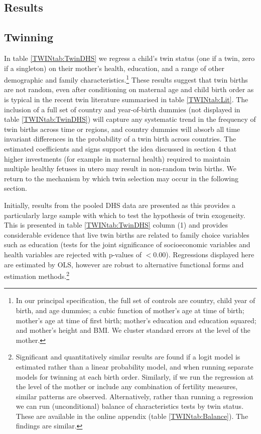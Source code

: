 \documentclass[subeqn]{article}
\begin{document}
\begin{spacing}{1.4}
\section{Results}                                  \label{TWINscn:results}
\subsection{Twinning}                              \label{TWINsscn:twinning}
In table \ref{TWINtab:TwinDHS} we regress a child's twin status (one if a twin, 
zero if a singleton) on their mother's health, education, and a range of other 
demographic and family characteristics.\footnote{In our principal specification, 
the full set of controls are country, child year of birth, and age dummies; a 
cubic function of mother's age at time of birth; mother's age at time of first 
birth; mother's education and education squared; and mother's height and BMI. 
We cluster standard errors at the level of the mother.}  These results suggest
that twin births are not random, even after conditioning on maternal age and 
child birth order as is typical in the recent twin literature summarised in table
\ref{TWINtab:Lit}. The inclusion of a full set of country and year-of-birth
dummies (not displayed in table \ref{TWINtab:TwinDHS}) will capture any 
systematic trend in the frequency of twin births across time or regions, and 
country dummies will absorb all time invariant differences in the probability 
of a twin birth across countries. The estimated coefficients and signs support 
the idea discussed in section 4 that higher investments (for example in maternal 
health) required to maintain multiple healthy fetuses in utero may result in 
non-random twin births. We return to the mechanism by which twin selection may
occur in the following section.

Initially, results from the pooled DHS data are presented as this provides a 
particularly large sample with which to test the hypothesis of twin exogeneity. 
This is presented in table \ref{TWINtab:TwinDHS} column (1) and provides 
considerable evidence that live twin births are related to family choice 
variables such as education (tests for the joint significance of socioeconomic 
variables and health variables are rejected with p-values of $<$0.00).  
Regressions displayed here are estimated by OLS, however are robust to 
alternative functional forms and estimation methods.\footnote{Significant and 
quantitatively similar results are found if a logit model is estimated rather 
than a linear probability model, and when running separate models for twinning at 
each birth order. Similarly, if we run the regression at the level of the mother 
or include any combination of fertility measures, similar patterns are observed.
Alternatively, rather than running a regression we can run (unconditional) balance 
of characteristics tests by twin status.  These are available in the online 
appendix (table \ref{TWINtab:Balance}).  The findings are similar.}


\end{spacing}
\end{document}
